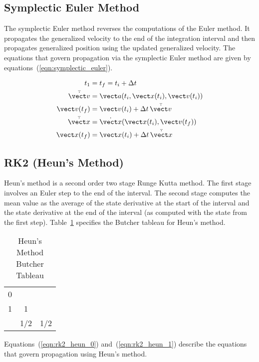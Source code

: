 \subsection{Symplectic Euler Method}
The symplectic Euler method reverses the computations of the Euler method.
It propagates the generalized velocity to the end of the integration
interval and then propagates generalized position using the updated
generalized velocity.
The equations that govern propagation via the symplectic Euler method
are given by equations~(\ref{eqn:symplectic_euler}).

\begin{equation}
\label{eqn:symplectic_euler}
\begin{split}
t_1 &= t_f = t_i + \Delta t \\
\bar{\dot{\vect v}} &= \vect a(t_i,\vect x(t_i),\vect v(t_i)) \\
\vect v(t_f) &= \vect v(t_i) + \Delta t \, \bar{\dot{\vect v}} \\
\bar{\dot{\vect x}} &= \dot {\vect x}(\vect x(t_i),\vect v(t_f)) \\
\vect x(t_f) &= \vect x(t_i) + \Delta t \, \bar{\dot{\vect x}}
\end{split}
\end{equation}

\subsection{RK2 (Heun's Method)}
Heun's method is a second order two stage Runge Kutta method.
The first stage involves an Euler step to the end of the interval.
The second stage computes the mean value as the average of
the state derivative at the start of the interval and
the state derivative at the end of the interval
(as computed with the state from the first step).
Table~\ref{tab:heun_butcher} specifies the Butcher tableau for Heun's method.

\begin{table}[htp]
\centering
\caption{Heun's Method Butcher Tableau}
\label{tab:heun_butcher}
\vspace{1.5ex}
\begin{tabular}{c|cc}
0 && \\
1 & 1 & \\
\hline
& 1/2 & 1/2
\end{tabular}
\end{table}

Equations~(\ref{eqn:rk2_heun_0}) and~(\ref{eqn:rk2_heun_1}) describe
the equations that govern propagation using Heun's method.
 
